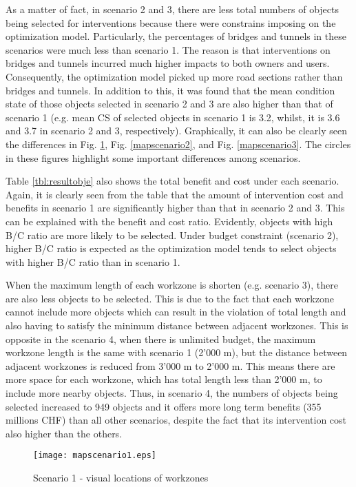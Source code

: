 \documentclass[a4paper,3p,times,authoryear]{elsarticle}
\begin{document}
As a matter of fact, in scenario 2 and 3, there are less total numbers of objects being selected for interventions because there were constrains imposing on the optimization model. Particularly, the percentages of bridges and tunnels in these scenarios were much less than scenario 1. The reason is that interventions on bridges and tunnels incurred much higher impacts to both owners and users. Consequently, the optimization model picked up more road sections rather than bridges and tunnels. In addition to this, it was found that the mean condition state of those objects selected in scenario 2 and 3 are also higher than that of scenario 1 (e.g. mean CS of selected objects in scenario 1 is 3.2, whilst, it is 3.6 and 3.7 in scenario 2 and 3, respectively). Graphically, it can also be clearly seen the differences in Fig. \ref{mapscenario1}, Fig. \ref{mapscenario2}, and Fig. \ref{mapscenario3}. The circles in these figures highlight some important differences among scenarios. 

Table \ref{tbl:resultobje} also shows the total benefit and cost under each scenario. Again, it is clearly seen from the table that the amount of intervention cost and benefits in scenario 1 are significantly higher than that in scenario 2 and 3. This can be explained with the benefit and cost ratio. Evidently, objects with high B/C ratio are more likely to be selected. Under budget constraint (scenario 2), higher B/C ratio is expected as the optimization model tends to select objects with higher B/C ratio than in scenario 1.

When the maximum length of each workzone is shorten (e.g. scenario 3), there are also less objects to be selected. This is due to the fact that each workzone cannot include more objects which can result in the violation of total length and also having to satisfy the minimum distance between adjacent workzones. This is opposite in the scenario 4, when there is unlimited budget, the maximum workzone length is the same with scenario 1 (2'000 m), but the distance between adjacent workzones is reduced from 3'000 m to 2'000 m. This means there are more space for each workzone, which has total length less than 2'000 m, to include more nearby objects. Thus, in scenario 4, the numbers of objects being selected increased to 949 objects and it offers more long term benefits (355 millions CHF) than all other scenarios, despite the fact that its intervention cost also higher than the others.

\begin{figure}[H]
\begin{center}
\texttt{[image: mapscenario1.eps]}
\caption{Scenario 1 - visual locations of workzones}\label{mapscenario1}
\end{center}
\end{figure}
\end{document}

